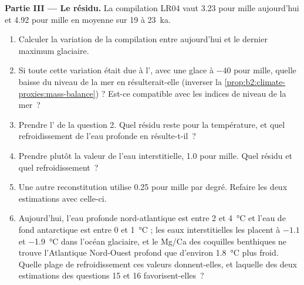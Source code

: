 \begin{problem}
\medskip\noindent\textbf{Partie III --- Le résidu.}
La compilation LR04 vaut \num{3.23} pour mille aujourd'hui et \num{4.92} pour mille en moyenne sur 19 à
\qty{23}{ka}.
\begin{enumerate}[resume]
  \item Calculer la variation de la compilation entre aujourd'hui et le dernier maximum glaciaire.
  \item Si toute cette variation était due à l', avec une glace à $-40$ pour mille, quelle baisse du niveau
        de la mer en résulterait-elle (inverser la \cref{prop:b2:climate-proxies:mass-balance}) ? Est-ce compatible avec
        les indices de niveau de la mer~?
  \item Prendre l' de la question 2. Quel résidu reste pour la température, et quel refroidissement
        de l'eau profonde en résulte-t-il~?
  \item Prendre plutôt la valeur de l'eau interstitielle, \num{1.0} pour mille. Quel résidu et quel refroidissement~?
  \item Une autre reconstitution utilise \num{0.25} pour mille par degré. Refaire les deux estimations avec celle-ci.
  \item Aujourd'hui, l'eau profonde nord-atlantique est entre 2 et \qty{4}{\celsius} et l'eau de fond antarctique
        est entre 0 et \qty{1}{\celsius} ; les eaux interstitielles les placent à $-1.1$ et \qty{-1.9}{\celsius}
        dans l'océan glaciaire, et le Mg/Ca des coquilles benthiques ne trouve l'Atlantique Nord-Ouest profond que
        d'environ \qty{1.8}{\celsius} plus froid. Quelle plage de refroidissement ces valeurs donnent-elles, et laquelle des
        deux estimations des questions 15 et 16 favorisent-elles~?
\end{enumerate}


\end{problem}

